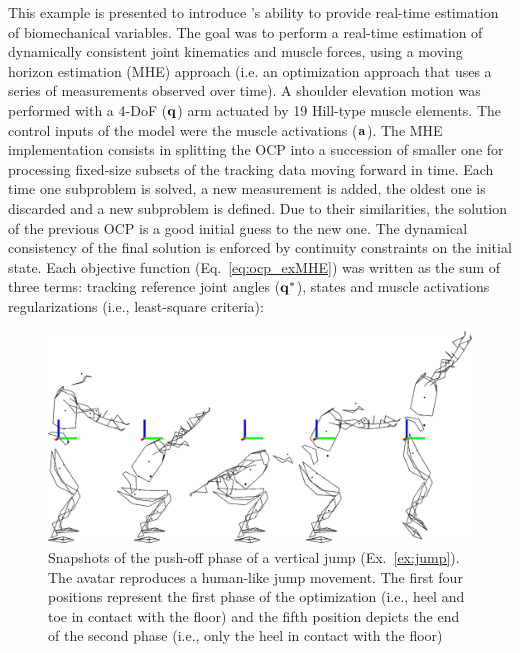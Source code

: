 This example is presented to introduce \bioptim's ability to provide real-time estimation of biomechanical variables.
The goal was to perform a real-time estimation of dynamically consistent joint kinematics and muscle forces, using a moving horizon estimation (MHE) approach (i.e. an optimization approach that uses a series of measurements observed over time). 
A shoulder elevation motion was performed with a 4-DoF ($\bf{q}$) arm actuated by 19 Hill-type muscle elements.
The control inputs of the model were the muscle activations ($\bf{a}$).
The MHE implementation consists in splitting the OCP into a succession of smaller one for processing fixed-size subsets of the tracking data moving forward in time. 
Each time one subproblem is solved, a new measurement is added, the oldest one is discarded and a new subproblem is defined. 
Due to their similarities, the solution of the previous OCP is a good initial guess to the new one. 
The dynamical consistency of the final solution is enforced by continuity constraints on the initial state. 
Each objective function (Eq.~\ref{eq:ocp_exMHE}) was written as the sum of three terms: tracking reference joint angles ($\bf{q^*}$), states and muscle activations regularizations (i.e., least-square criteria): 
\begin{figure}[t!]
\includegraphics[width=\columnwidth]{figures/kinogramme_jump}
\caption{Snapshots of the push-off phase of a vertical jump (Ex.~\ref{ex:jump}). The avatar reproduces a human-like jump movement. The first four positions represent the first phase of the optimization (i.e., heel and toe in contact with the floor) and the fifth position depicts the end of the second phase (i.e., only the heel in contact with the floor)} 
\label{fig:jump}
\end{figure}
